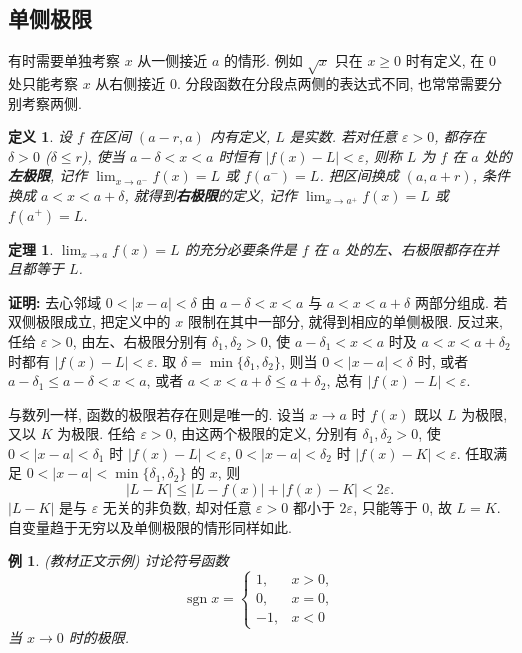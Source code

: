 \documentclass[UTF8,openany]{ctexbook}
\theoremstyle{chinesetextbook}
\newtheorem{definition}{定义}[section]
\newtheorem{example}{例}[section]
\newtheorem{theorem}{定理}[section]
\newenvironment{cnproof}{\par\indent\textbf{证明:} \ignorespaces}{\par}
\begin{document}
\subsection{单侧极限}
有时需要单独考察 $x$ 从一侧接近 $a$ 的情形. 例如 $\sqrt x$ 只在 $x\ge0$ 时有定义, 在 $0$ 处只能考察 $x$ 从右侧接近 $0$. 分段函数在分段点两侧的表达式不同, 也常常需要分别考察两侧.
\begin{definition}
设 $f$ 在区间 $(a-r,a)$ 内有定义, $L$ 是实数. 若对任意 $\varepsilon>0$, 都存在 $\delta>0$ ($\delta\le r$), 使当 $a-\delta<x<a$ 时恒有 $|f(x)-L|<\varepsilon$, 则称 $L$ 为 $f$ 在 $a$ 处的\textbf{左极限}, 记作 $\displaystyle\lim_{x\to a^-}f(x)=L$ 或 $f(a^-)=L$. 把区间换成 $(a,a+r)$, 条件换成 $a<x<a+\delta$, 就得到\textbf{右极限}的定义, 记作 $\displaystyle\lim_{x\to a^+}f(x)=L$ 或 $f(a^+)=L$.
\end{definition}
\begin{theorem}\label{thm:5-onesided}
$\displaystyle\lim_{x\to a}f(x)=L$ 的充分必要条件是 $f$ 在 $a$ 处的左、右极限都存在并且都等于 $L$.
\end{theorem}
\begin{cnproof}
去心邻域 $0<|x-a|<\delta$ 由 $a-\delta<x<a$ 与 $a<x<a+\delta$ 两部分组成. 若双侧极限成立, 把定义中的 $x$ 限制在其中一部分, 就得到相应的单侧极限. 反过来, 任给 $\varepsilon>0$, 由左、右极限分别有 $\delta_1,\delta_2>0$, 使 $a-\delta_1<x<a$ 时及 $a<x<a+\delta_2$ 时都有 $|f(x)-L|<\varepsilon$. 取 $\delta=\min\{\delta_1,\delta_2\}$, 则当 $0<|x-a|<\delta$ 时, 或者 $a-\delta_1\le a-\delta<x<a$, 或者 $a<x<a+\delta\le a+\delta_2$, 总有 $|f(x)-L|<\varepsilon$.
\end{cnproof}
与数列一样, 函数的极限若存在则是唯一的. 设当 $x\to a$ 时 $f(x)$ 既以 $L$ 为极限, 又以 $K$ 为极限. 任给 $\varepsilon>0$, 由这两个极限的定义, 分别有 $\delta_1,\delta_2>0$, 使 $0<|x-a|<\delta_1$ 时 $|f(x)-L|<\varepsilon$, $0<|x-a|<\delta_2$ 时 $|f(x)-K|<\varepsilon$. 任取满足 $0<|x-a|<\min\{\delta_1,\delta_2\}$ 的 $x$, 则
\[
|L-K|\le|L-f(x)|+|f(x)-K|<2\varepsilon.
\]
$|L-K|$ 是与 $\varepsilon$ 无关的非负数, 却对任意 $\varepsilon>0$ 都小于 $2\varepsilon$, 只能等于 $0$, 故 $L=K$. 自变量趋于无穷以及单侧极限的情形同样如此.
\begin{example}\label{ex:5-sgn}
\textnormal{(教材正文示例)} 讨论符号函数
\[
\operatorname{sgn}x=\begin{cases}1,&x>0,\\0,&x=0,\\-1,&x<0\end{cases}
\]
当 $x\to0$ 时的极限.
\end{example}
\end{document}
